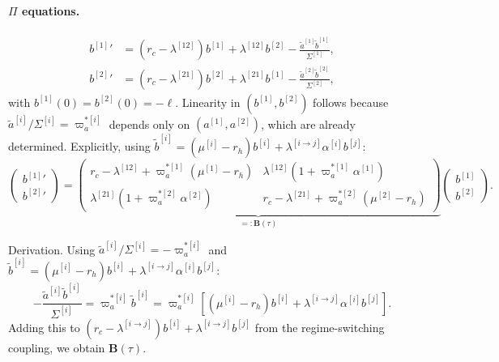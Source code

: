 \documentclass[11pt,a4paper]{article}
\numberwithin{equation}{section}
\begin{document}
\begin{appendices}
\paragraph{$\Pi$ equations.}\label{app:pi_eqs}
\begin{align}
{b^{[1]}}' &= (r_c - \lambda^{[12]})b^{[1]} + \lambda^{[12]} b^{[2]} - \frac{\tilde{a}^{[1]} \tilde{b}^{[1]}}{\Sigma^{[1]}}, \label{eq:ode_b1} \\
{b^{[2]}}' &= (r_c - \lambda^{[21]})b^{[2]} + \lambda^{[21]} b^{[1]} - \frac{\tilde{a}^{[2]} \tilde{b}^{[2]}}{\Sigma^{[2]}}, \label{eq:ode_b2}
\end{align}
with $b^{[1]}(0) = b^{[2]}(0) = -\ell$. Linearity in $(b^{[1]}, b^{[2]})$ follows because $\tilde{a}^{[i]}/\Sigma^{[i]} = \varpi^{*[i]}_a$ depends only on $(a^{[1]}, a^{[2]})$, which are already determined. Explicitly, using $\tilde{b}^{[i]} = (\mu^{[i]}-r_h)b^{[i]} + \lambda^{[i\to j]}\alpha^{[i]} b^{[j]}$:
\begin{equation}\label{eq:ode_b_matrix}
\begin{pmatrix} {b^{[1]}}' \\ {b^{[2]}}' \end{pmatrix} = \underbrace{\begin{pmatrix}
r_c - \lambda^{[12]} + \varpi^{*[1]}_a(\mu^{[1]}-r_h) & \lambda^{[12]}(1 + \varpi^{*[1]}_a \alpha^{[1]}) \\
\lambda^{[21]}(1 + \varpi^{*[2]}_a \alpha^{[2]}) & r_c - \lambda^{[21]} + \varpi^{*[2]}_a(\mu^{[2]}-r_h)
\end{pmatrix}}_{\displaystyle =: \mathbf{B}(\tau)} \begin{pmatrix} b^{[1]} \\ b^{[2]} \end{pmatrix}.
\end{equation}

\noindent Derivation. Using $\tilde{a}^{[i]}/\Sigma^{[i]} = -\varpi^{*[i]}_a$ and $\tilde{b}^{[i]} = (\mu^{[i]}-r_h)b^{[i]} + \lambda^{[i\to j]}\alpha^{[i]}b^{[j]}$:
\begin{equation}\label{eq:b_derivation}
-\frac{\tilde{a}^{[i]}\tilde{b}^{[i]}}{\Sigma^{[i]}} = \varpi^{*[i]}_a \tilde{b}^{[i]} = \varpi^{*[i]}_a\!\left[(\mu^{[i]}-r_h)b^{[i]} + \lambda^{[i\to j]}\alpha^{[i]}b^{[j]}\right].
\end{equation}
Adding this to $(r_c-\lambda^{[i\to j]})b^{[i]} + \lambda^{[i\to j]}b^{[j]}$ from the regime-switching coupling, we obtain $\mathbf{B}(\tau)$.


\end{appendices}
\end{document}
